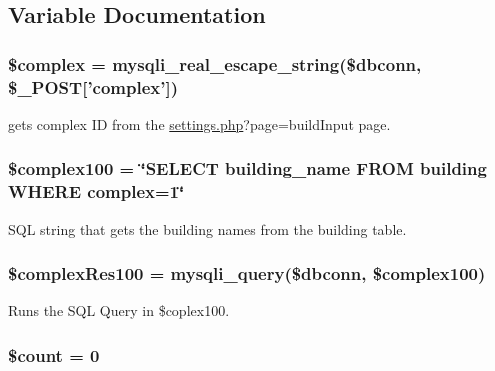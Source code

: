 \subsection{\-Variable \-Documentation}
\hypertarget{upBuildTable_8php_a25ec02534214977602829622b78b5d78}{
\subsubsection[{\$complex}]{\setlength{\rightskip}{0pt plus 5cm}\$complex = mysqli\-\_\-real\-\_\-escape\-\_\-string(\$dbconn, \$\-\_\-\-P\-O\-S\-T\mbox{[}'complex'\mbox{]})}}\label{upBuildTable_8php_a25ec02534214977602829622b78b5d78}
gets complex \-I\-D from the \hyperlink{settings_8php}{settings.\-php}?page=build\-Input page. \hypertarget{upBuildTable_8php_a649817e46b95fbef9ea44e119999dada}{
\subsubsection[{\$complex100}]{\setlength{\rightskip}{0pt plus 5cm}\$complex100 = \char`\"{}\-S\-E\-L\-E\-C\-T building\-\_\-name \-F\-R\-O\-M building \-W\-H\-E\-R\-E complex=1\char`\"{}}}\label{upBuildTable_8php_a649817e46b95fbef9ea44e119999dada}
\-S\-Q\-L string that gets the building names from the building table. \hypertarget{upBuildTable_8php_aa5d9e7c76b4a1d987e4877d6115c0a38}{
\subsubsection[{\$complex\-Res100}]{\setlength{\rightskip}{0pt plus 5cm}\$complex\-Res100 = mysqli\-\_\-query(\$dbconn, \$complex100)}}\label{upBuildTable_8php_aa5d9e7c76b4a1d987e4877d6115c0a38}
\-Runs the \-S\-Q\-L \-Query in \$coplex100. \hypertarget{upBuildTable_8php_af789423037bbc89dc7c850e761177570}{
\subsubsection[{\$count}]{\setlength{\rightskip}{0pt plus 5cm}\$count = 0}}\label{upBuildTable_8php_af789423037bbc89dc7c850e761177570}
